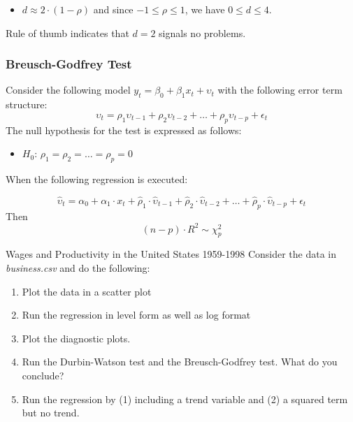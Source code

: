 \documentclass[
]{article}
\providecommand{\tightlist}{%
  \setlength{\itemsep}{0pt}\setlength{\parskip}{0pt}}
\begin{document}
\begin{itemize}
\tightlist
\item
  \(d \approx 2 \cdot (1-\rho)\) and since \(-1 \leq \rho \leq 1\), we have \(0 \leq d \leq 4\).
\end{itemize}

Rule of thumb indicates that \(d=2\) signals no problems.

\hypertarget{breusch-godfrey-test}{%
\subsubsection{Breusch-Godfrey Test}\label{breusch-godfrey-test}}

Consider the following model \(y_t = \beta_0 + \beta_1 x_t + \upsilon_t\) with the following error term structure:
\[\upsilon_t = \rho_1 \upsilon_{t-1} + \rho_2 \upsilon_{t-2} + \dots + \rho_p \upsilon_{t-p} + \epsilon_t\]
The null hypothesis for the test is expressed as follows:

\begin{itemize}
\tightlist
\item
  \(H_0\): \(\rho_1 = \rho_2 = \dots = \rho_p =0\)
\end{itemize}

When the following regression is executed:

\[\hat{\upsilon}_t = \alpha_0 + \alpha_1 \cdot x_t + \hat{\rho}_1 \cdot \hat{\upsilon}_{t-1} + \hat{\rho}_2 \cdot \hat{\upsilon}_{t-2} + \dots + \hat{\rho}_p \cdot \hat{\upsilon}_{t-p} + \epsilon_t\]
Then
\[(n-p) \cdot R^2 \sim \chi^2_p\]

\begin{frame}{Wages and Productivity in the United States 1959-1998}
    Consider the data in \emph{business.csv} and do the following:
        \begin{enumerate}
            \item Plot the data in a scatter plot
            \item Run the regression in level form as well as log format
            \item Plot the diagnostic plots.
            \item Run the Durbin-Watson test and the Breusch-Godfrey test. What do you conclude?
            \item Run the regression by (1) including a trend variable and (2) a squared term but no trend.
        \end{enumerate}
\end{frame}
\end{document}
